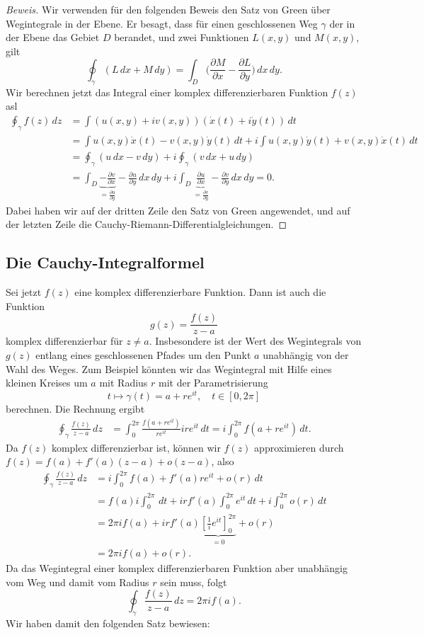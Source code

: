 \begin{proof}[Beweis]
Wir verwenden für den folgenden Beweis den Satz von Green über
%
Wegintegrale in der Ebene.
Er besagt, dass für einen geschlossenen Weg $\gamma$ der in der Ebene
das Gebiet $D$ berandet, und zwei Funktionen $L(x,y)$ und $M(x,y)$, gilt
\[
\oint_\gamma(L\,dx + M\,dy)
=
\int_D \biggl(\frac{\partial M}{\partial x}
-\frac{\partial L}{\partial y}\biggr)\,dx\,dy.
\]
Wir berechnen jetzt das Integral einer komplex differenzierbaren Funktion
$f(z)$ asl
\begin{align*}
\oint_\gamma f(z)\,dz
&=
\int (u(x,y)+iv(x,y))(\dot x(t)+i\dot y(t))\,dt
\\
&=
\int u(x,y)\dot x(t) -v(x,y)\dot y(t)\,dt
+
i \int u(x,y)\dot y(t)+v(x,y)\dot x(t)\,dt
\\
&=\oint_\gamma(u\,dx - v\,dy) + i\oint_\gamma(v\,dx + u\,dy)
\\
&=
\int_D
\underbrace{-\frac{\partial v}{\partial x}}_{\displaystyle=\frac{\partial u}{\partial y}}
-\frac{\partial u}{\partial y}
\,dx\,dy
+i
\int_D
\underbrace{\frac{\partial u}{\partial x}}_{\displaystyle=\frac{\partial v}{\partial y}}
-\frac{\partial v}{\partial y}\,dx\,dy
=0.
\end{align*}
Dabei haben wir auf der dritten Zeile den Satz von Green angewendet,
und auf der letzten Zeile die Cauchy-Riemann-Differentialgleichungen.
\end{proof}

%
%
\subsection{Die Cauchy-Integralformel}
%
Sei jetzt $f(z)$ eine komplex differenzierbare Funktion.
Dann ist auch die Funktion
\[
g(z)=\frac{f(z)}{z-a}
\]
komplex differenzierbar für $z\ne a$.
Insbesondere ist der Wert des Wegintegrals von $g(z)$ entlang
eines geschlossenen Pfades um den Punkt $a$ unabhängig von der Wahl
des Weges.
Zum Beispiel könnten wir das Wegintegral mit Hilfe eines kleinen Kreises
um $a$ mit Radius $r$ mit der Parametrisierung
\[
t\mapsto \gamma(t)=a+re^{it},\quad t\in[0,2\pi]
\]
berechnen.
Die Rechnung ergibt
\begin{align*}
\oint_\gamma \frac{f(z)}{z-a}\,dz
&=
\int_0^{2\pi} \frac{f(a+re^{it})}{re^{it}}ire^{it}\,dt
=
i\int_0^{2\pi} f(a+re^{it})\,dt.
\end{align*}
Da $f(z)$ komplex differenzierbar ist, können wir $f(z)$ approximieren
durch $f(z)=f(a)+f'(a)(z-a)+o(z-a)$, also
\begin{align*}
\oint_{\gamma} \frac{f(z)}{z-a}\,dz
&=
i\int_0^{2\pi}f(a) + f'(a)re^{it}+o(r)\,dt
\\
&=
f(a)i\int_0^{2\pi}\,dt
+ irf'(a)\int_0^{2\pi} e^{it}\,dt + i\int_0^{2\pi}o(r)\,dt
\\
&=
2\pi i f(a) + irf'(a)\underbrace{\left[\frac1{i}e^{it}\right]_0^{2\pi}}_{\displaystyle=0}+o(r)
\\
&=2\pi i f(a)+o(r).
\end{align*}
Da das Wegintegral einer komplex differenzierbaren Funktion aber unabhängig
vom Weg und damit vom Radius $r$ sein muss, folgt
\[
\oint_\gamma \frac{f(z)}{z-a}\,dz=2\pi i f(a).
\]
Wir haben damit den folgenden Satz bewiesen:

